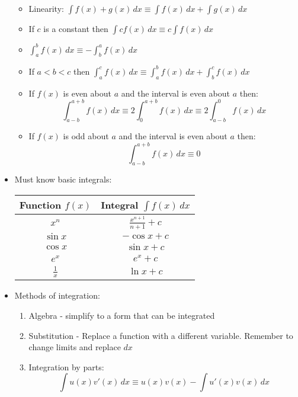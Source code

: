 \documentclass{article}
\begin{document}
\begin{itemize}
\begin{itemize}
\item Linearity: \(\int f(x)+g(x)\,dx\equiv\int f(x)\,dx+\int g(x)\,dx\)
\item If \(c\) is a constant then \(\int cf(x)\,dx\equiv c\int f(x)\,dx\)
\item \(\int_a^bf(x)\,dx\equiv-\int_b^af(x)\,dx\)
\item If \(a<b<c\) then \(\int_a^cf(x)\,dx\equiv\int_a^bf(x)\,dx+\int_b^cf(x)\,dx\)
\item If \(f(x)\) is even about \(a\) and the interval is even about \(a\) then:
\[\int_{a-b}^{a+b}f(x)\,dx\equiv2\int_0^{a+b}f(x)\,dx\equiv2\int_{a-b}^0f(x)\,dx\]
\item If \(f(x)\) is odd about \(a\) and the interval is even about \(a\) then:
\[\int_{a-b}^{a+b}f(x)\,dx\equiv0\]
\end{itemize}
\item Must know basic integrals:
\begin{center}
\begin{tabular}{|c|c|}\hline
Function \(f(x)\) & Integral \(\int f(x)\,dx\)\\ \hline
\(x^n\) & \(\frac{x^{n+1}}{n+1}+c\)\\ \hline
\(\sin x\) & \(-\cos x +c\)\\ \hline
\(\cos x\) & \(\sin x +c\)\\ \hline
\(e^x\) & \(e^x +c\)\\ \hline
\(\frac{1}{x}\) & \(\ln x +c\)\\ \hline
\end{tabular}
\end{center}
\item Methods of integration:
\begin{enumerate}
\item Algebra - simplify to a form that can be integrated
\item Substitution - Replace a function with a different variable. Remember to change limits and replace \(dx\)
\item Integration by parts:
\[\int u(x)v'(x)\,dx\equiv u(x)v(x)-\int u'(x)v(x)\,dx\]
\end{enumerate}
\end{itemize}
\end{document}
